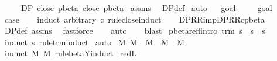 \begin{isabellebody}
\ \ \ \ \ {\isachardoublequoteopen}DP\ {\isacharparenleft}close\ pbeta{\isacharparenright}\ {\isacharparenleft}close\ pbeta{\isacharparenright}{\isachardoublequoteclose}\isanewline
%
\isadelimproof
%
\endisadelimproof
%
\isatagproof
{}\isamarkupfalse%
\ assms\ \isamarkupfalse%
\ DP{\isacharunderscore}def\isanewline
{}\isamarkupfalse%
\ auto\isanewline
{}\isamarkupfalse%
\ {\isacharminus}\isanewline
{}\isamarkupfalse%
\ goal{}\ \isanewline
\ \ \isamarkupfalse%
\ goal{}{\isacharparenleft}{}{\isacharcomma}{}{\isacharparenright}\ \isamarkupfalse%
\ {\isacharquery}case\isanewline
\ \ \isamarkupfalse%
\ {\isacharparenleft}induct\ arbitrary{\isacharcolon}\ c\ rule{\isacharcolon}close{\isachardot}induct{\isacharparenright}\isanewline
\ \ \isamarkupfalse%
\ DP{\isacharunderscore}R{\isacharunderscore}R{\isacharunderscore}imp{\isacharunderscore}DP{\isacharunderscore}R{\isacharunderscore}Rc{\isacharunderscore}pbeta\ \isamarkupfalse%
\ DP{\isacharunderscore}def\ assms\ \isamarkupfalse%
\ fastforce\isanewline
\ \ \isamarkupfalse%
\ auto\isanewline
\ \ \isamarkupfalse%
\ blast\isanewline
{}\isamarkupfalse%
%
\endisatagproof
{\isafoldproof}%
%
\isadelimproof
\isanewline
%
\endisadelimproof
\isanewline
{}\isamarkupfalse%
\ pbeta{\isacharunderscore}refl{\isacharbrackleft}intro{\isacharbrackright}{\isacharcolon}\ {\isachardoublequoteopen}trm\ s\ {\isasymLongrightarrow}\ s\ {\isasymggreater}\ s{\isachardoublequoteclose}\isanewline
%
\isadelimproof
%
\endisadelimproof
%
\isatagproof
{}\isamarkupfalse%
\ {\isacharparenleft}induct\ s\ rule{\isacharcolon}trm{\isachardot}induct{\isacharparenright}\isanewline
{}\isamarkupfalse%
\ auto%
\endisatagproof
{\isafoldproof}%
%
\isadelimproof
\isanewline
%
\endisadelimproof
\isanewline
{}\isamarkupfalse%
\ M{}{\isacharprime}{\isacharcolon}\ {\isachardoublequoteopen}M\ {\isasymRightarrow}\ M{\isacharprime}\ {\isasymLongrightarrow}\ M\ {\isasymggreater}\ M{\isacharprime}{\isachardoublequoteclose}\isanewline
%
\isadelimproof
%
\endisadelimproof
%
\isatagproof
{}\isamarkupfalse%
\ {\isacharparenleft}induct\ M\ M{\isacharprime}\ rule{\isacharcolon}beta{\isacharunderscore}Y{\isachardot}induct{\isacharparenright}\isanewline
{}\isamarkupfalse%
\ red{\isacharunderscore}L\ \isanewline

\end{isabellebody}
